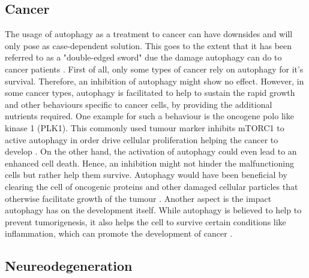 \documentclass[12pt]{article} %
\begin{document}
\begin{linenumbers*}
\subsection{Cancer}

The usage of autophagy as a treatment to cancer can have downsides and will only pose as case-dependent solution. This goes to the extent that it has been referred to as a "double-edged sword" due the damage autophagy can do to cancer patients \citep{Dikic2018}.
First of all,  only some types of cancer rely on autophagy for it's survival. Therefore, an inhibition of autophagy might show no effect. However, in some cancer types, autophagy is facilitated to help to sustain the rapid growth and other behaviours specific to cancer cells, by providing the additional nutrients required. One example for such a behaviour is the oncogene polo like kinase 1 (PLK1). This commonly used tumour marker inhibits mTORC1 to active autophagy in order drive cellular proliferation helping the cancer to develop \citep{Ruf2017}.
On the other hand, the activation of autophagy could even lead to an enhanced cell death.
Hence, an inhibition might not hinder the malfunctioning cells but rather help them survive. Autophagy would have been beneficial by clearing the cell of oncogenic proteins and other damaged cellular particles that otherwise facilitate growth of the tumour \citep{Lane2017b, White2012}.
Another aspect is the impact autophagy has on the development itself.  While autophagy is believed to help to prevent tumorigenesis, it also helps the cell to survive certain conditions like inflammation, which can promote the development of cancer \citep{Lane2017b, Dikic2018}.


\subsection{Neureodegeneration}


\end{linenumbers*}
\end{document}
